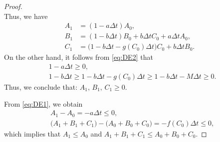 \documentclass[12pt]{article}
\theoremstyle{definition}
\theoremstyle{remark}
\numberwithin{equation}{section}
\begin{document}
{\begin{proof}
\begin{equation}
\end{equation}
Thus, we have
\begin{equation*}
\begin{split}
A_{1} &= (1 -a\Delta t) A_0,\\
B_{1} &= (1 - b\Delta t)B_0 + b\Delta t C_0 + a\Delta t A_0,\\
C_{1} &= \big(1 - b\Delta t - g(C_0)\Delta t\big)C_0 +  b\Delta t B_0.
\end{split}
\end{equation*}
%
%
On the other hand, it follows from \eqref{eq:DE2} that
\begin{equation*}
\begin{split}
&1 - a\Delta t \geq 0,\\
&1 - b \Delta t \geq 1 - b \Delta t - g(C_0)\Delta t \geq 1 - b\Delta t - M\Delta t \geq 0.
\end{split}
\end{equation*}
Thus, we conclude that: $A_1,\,B_1,\,C_1 \geq 0$.

From \eqref{eq:DE1}, we obtain
\begin{equation*}
\begin{split}
&A_{1} - A_0 = -a\Delta t \leq 0,\\
&\big(A_{1} + B_{1} + C_{1}\big) - \big(A_0 + B_0 + C_0\big) = -f(C_0)\Delta t \leq 0,
\end{split}
\end{equation*}
which implies that $A_1 \leq A_0$ and $A_1 + B_1 + C_1 \leq A_0 + B_0 + C_0$.


\end{proof}}
\end{document}
